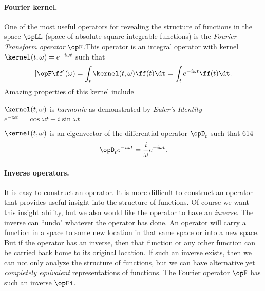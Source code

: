 \paragraph{Fourier kernel.}
One of the most useful operators for revealing the structure of
functions in the space $\spLL$ (space of absolute square integrable functions)
is the {\em Fourier Transform operator} $\opF$.\footnotemark[\value{footnote}]
This operator is an integral operator with kernel
$\kernel(t,\omega)=e^{-i\omega t}$ such that
  \[ [\opF\ff](\omega) = \int_t \kernel(t,\omega)\ff(t)\dt = \int_t e^{-i\omega t}\ff(t)\dt. \]
Amazing properties of this kernel include
\begin{enume}
  \item $\kernel(t,\omega)$ is {\em harmonic}
        as demonstrated by {\em Euler's Identity}
        $e^{-i\omega t}=\cos\omega t -i\sin\omega t$ \footnotemark[\value{footnote}]
  \item $\kernel(t,\omega)$ is an eigenvector of the differential operator
        $\opD_t$ such that \citep{strang89}{614}
        \[\opD_t e^{-i\omega t} = \frac{i}{\omega} e^{-i\omega t}.\]
\end{enume}

\paragraph{Inverse operators.}
It is easy to construct an operator.
It is more difficult to construct an operator that provides useful
insight into the structure of functions.
Of course we want this insight ability, but we
also would like the operator to have an {\em inverse}.
The inverse can ``undo" whatever the operator has done.
An operator will carry a function in a space to some new location
in that same space or into a new space.
But if the operator has an inverse,
then that function or any other function can be carried back home to
its original location.
If such an inverse exists, then we can not only analyze the structure of
functions, but we can have alternative yet {\em completely equivalent}
representations of functions.
The Fourier operator $\opF$ has such an inverse $\opFi$.

